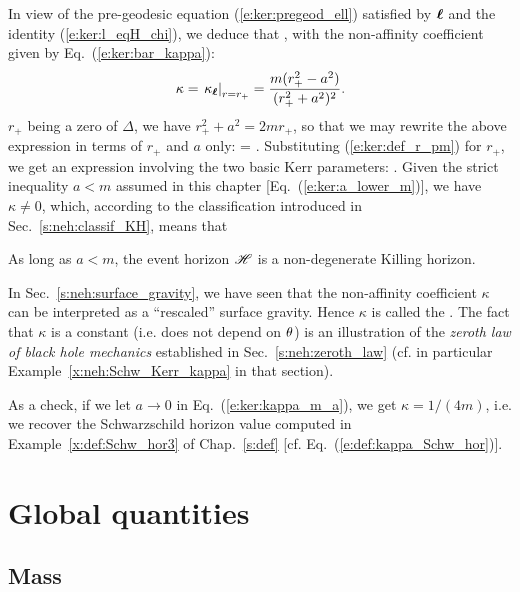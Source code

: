 In view of the pre-geodesic equation (\ref{e:ker:pregeod_ell}) satisfied
by $\bm{\ell}$ and the identity (\ref{e:ker:l_eqH_chi}), we deduce that
\be \label{e:ker:pregeod_chi}
    \encadre{ \wnab_{\w{\chi}}\, \w{\chi} \equalH \kappa \, \w{\chi} },
\ee
with the non-affinity coefficient given by Eq.~(\ref{e:ker:bar_kappa}):
\[
    \kappa = \left. \kappa_{\bm{\ell}} \right| _{r=r_+} = \frac{m(r_+^2-a^2)}{(r_+^2+a^2)^2} .
\]
$r_+$ being a zero of $\Delta$, we have $r_+^2 + a^2 = 2 m r_+$, so that we may
rewrite the above expression in terms of $r_+$ and $a$ only:
\be
    \kappa =  .
\ee
Substituting (\ref{e:ker:def_r_pm}) for $r_+$, we get an expression involving
the two basic Kerr parameters:
\be \label{e:ker:kappa_m_a}
     .
\ee
Given the strict inequality $a<m$ assumed in this chapter [Eq.~(\ref{e:ker:a_lower_m})],
we have $\kappa\not=0$, which, according to the classification introduced in
Sec.~\ref{s:neh:classif_KH}, means that
\begin{greybox}
As long as $a<m$, the event horizon $\mathscr{H}$ is a non-degenerate Killing horizon.
\end{greybox}
In Sec.~\ref{s:neh:surface_gravity}, we have seen that the non-affinity coefficient
$\kappa$ can be interpreted as a ``rescaled'' surface gravity. Hence $\kappa$
is called
the .
The fact that $\kappa$ is a constant (i.e. does not depend on $\theta$) is
an illustration of the \emph{zeroth law of black hole mechanics}
established in Sec.~\ref{s:neh:zeroth_law} (cf. in particular
Example~\ref{x:neh:Schw_Kerr_kappa} in that section).
\begin{remark}
As a check, if we let $a\rightarrow 0$ in Eq.~(\ref{e:ker:kappa_m_a}), we get
$\kappa = 1/(4m)$, i.e. we recover the Schwarzschild horizon value computed in
Example~\ref{x:def:Schw_hor3} of Chap.~\ref{s:def} [cf. Eq.~(\ref{e:def:kappa_Schw_hor})].
\end{remark}


\section{Global quantities}

\subsection{Mass} \label{s:ker:Komar_mass}

